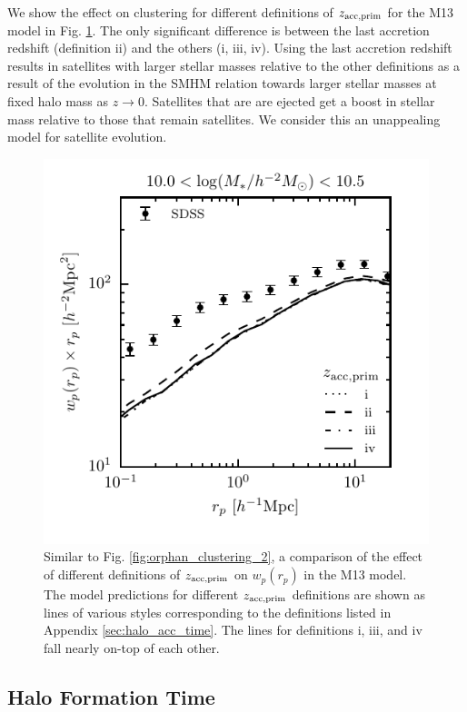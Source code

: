 \documentclass[a4paper,fleqn,usenatbib]{mnras}
\begin{document}
We show the effect on clustering for different definitions of $z_{\rm acc, prim}$ for the M13 model in Fig. \ref{fig:zacc_wp_comp}.  The only significant difference is between the last accretion redshift (definition ii) and the others (i, iii, iv).  Using the last accretion redshift results in satellites with larger stellar masses relative to the other definitions as a result of the evolution in the SMHM relation towards larger stellar masses at fixed halo mass as $z \rightarrow 0$.  Satellites that are are ejected get a boost in stellar mass relative to those that remain satellites.  We consider this an unappealing model for satellite evolution.
          
%
\begin{figure}
\includegraphics[]{figures/wp_comparison_zacc_prime_2.pdf}
\caption{Similar to Fig. \ref{fig:orphan_clustering_2}, a comparison of the effect of different definitions of $z_{\rm acc, prim}$ on $w_p(r_p)$ in the M13 model.  The model predictions for different $z_{\rm acc, prim}$ definitions are shown as lines of various styles corresponding to the definitions listed in Appendix \ref{sec:halo_acc_time}.  The lines for definitions i, iii, and iv fall nearly on-top of each other.}
\label{fig:zacc_wp_comp}
\end{figure}
%

\subsection{Halo Formation Time}
\end{document}
